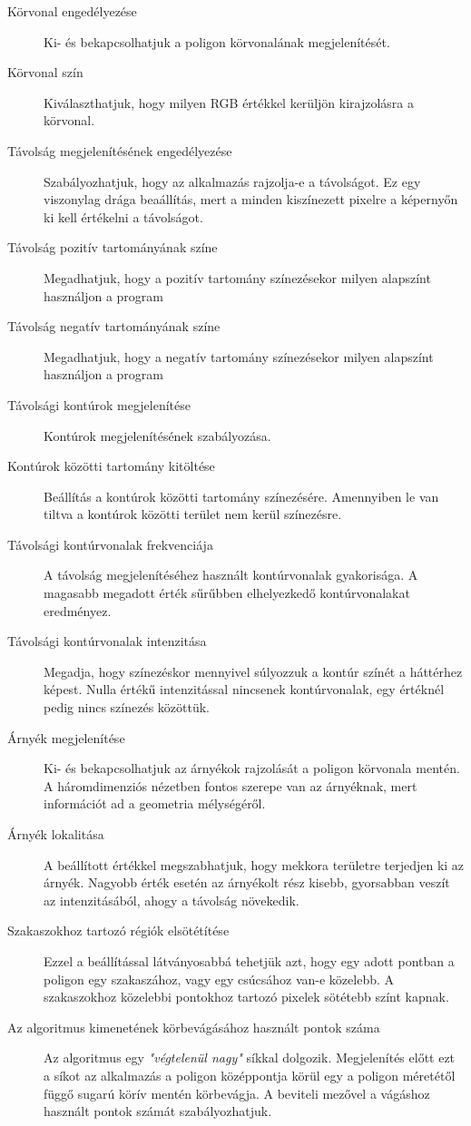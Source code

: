 \begin{description}
    \item[Körvonal engedélyezése] Ki- és bekapcsolhatjuk a poligon körvonalának megjelenítését.
    \item[Körvonal szín] Kiválaszthatjuk, hogy milyen RGB értékkel kerüljön kirajzolásra a körvonal.
    \item[Távolság megjelenítésének engedélyezése] Szabályozhatjuk, hogy az alkalmazás rajzolja-e a távolságot. Ez egy viszonylag drága beaállítás, mert a minden kiszínezett pixelre a képernyőn ki kell értékelni a távolságot.
    \item[Távolság pozitív tartományának színe] Megadhatjuk, hogy a pozitív tartomány színezésekor milyen alapszínt használjon a program
    \item[Távolság negatív tartományának színe] Megadhatjuk, hogy a negatív tartomány színezésekor milyen alapszínt használjon a program
    \item[Távolsági kontúrok megjelenítése] Kontúrok megjelenítésének szabályozása.
    \item[Kontúrok közötti tartomány kitöltése] Beállítás a kontúrok közötti tartomány színezésére. Amennyiben le van tiltva a kontúrok közötti terület nem kerül színezésre.
    \item[Távolsági kontúrvonalak frekvenciája] A távolság megjelenítéséhez használt kontúrvonalak gyakorisága. A magasabb megadott érték sűrűbben elhelyezkedő kontúrvonalakat eredményez.
    \item[Távolsági kontúrvonalak intenzitása] Megadja, hogy színezéskor mennyivel súlyozzuk a kontúr színét a háttérhez képest. Nulla értékű intenzitással nincsenek kontúrvonalak, egy értéknél pedig nincs színezés közöttük.
    \item[Árnyék megjelenítése] Ki- és bekapcsolhatjuk az árnyékok rajzolását a poligon körvonala mentén. A háromdimenziós nézetben fontos szerepe van az árnyéknak, mert információt ad a geometria mélységéről.
    \item[Árnyék lokalitása] A beállított értékkel megszabhatjuk, hogy mekkora területre terjedjen ki az árnyék. Nagyobb érték esetén az árnyékolt rész kisebb, gyorsabban veszít az intenzitásából, ahogy a távolság növekedik.
    \item[Szakaszokhoz tartozó régiók elsötétítése] Ezzel a beállítással látványosabbá tehetjük azt, hogy egy adott pontban a poligon egy szakaszához, vagy egy csúcsához van-e közelebb. A szakaszokhoz közelebbi pontokhoz tartozó pixelek sötétebb színt kapnak.
    \item[Az algoritmus kimenetének körbevágásához használt pontok száma] Az algoritmus egy \textit{"végtelenül nagy"} síkkal dolgozik. Megjelenítés előtt ezt a síkot az alkalmazás a poligon középpontja körül egy a poligon méretétől függő sugarú körív mentén körbevágja. A beviteli mezővel a vágáshoz használt pontok számát szabályozhatjuk.
\end{description}

